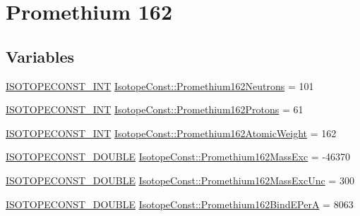 \hypertarget{group___isotope_const-_promethium-_pm162}{}\section{Promethium 162}
\label{group___isotope_const-_promethium-_pm162}
\subsection*{Variables}
\begin{DoxyCompactItemize}
\item 
\mbox{\hyperlink{group___isotope_const-_macros_ga5f18360b3e99483a35c32d789e62621c}{I\+S\+O\+T\+O\+P\+E\+C\+O\+N\+S\+T\+\_\+\+I\+NT}} \mbox{\hyperlink{group___isotope_const-_promethium-_pm162_ga5358b4eb7dfb42b98f19859640707a99}{Isotope\+Const\+::\+Promethium162\+Neutrons}} = 101
\item 
\mbox{\hyperlink{group___isotope_const-_macros_ga5f18360b3e99483a35c32d789e62621c}{I\+S\+O\+T\+O\+P\+E\+C\+O\+N\+S\+T\+\_\+\+I\+NT}} \mbox{\hyperlink{group___isotope_const-_promethium-_pm162_ga17e4b0c58109314fa5bb46483b16d003}{Isotope\+Const\+::\+Promethium162\+Protons}} = 61
\item 
\mbox{\hyperlink{group___isotope_const-_macros_ga5f18360b3e99483a35c32d789e62621c}{I\+S\+O\+T\+O\+P\+E\+C\+O\+N\+S\+T\+\_\+\+I\+NT}} \mbox{\hyperlink{group___isotope_const-_promethium-_pm162_ga0e86ff697e97b1bd37244df235bbaf2f}{Isotope\+Const\+::\+Promethium162\+Atomic\+Weight}} = 162
\item 
\mbox{\hyperlink{group___isotope_const-_macros_ga8f45a7272ce02c0b4c65c44636ed719a}{I\+S\+O\+T\+O\+P\+E\+C\+O\+N\+S\+T\+\_\+\+D\+O\+U\+B\+LE}} \mbox{\hyperlink{group___isotope_const-_promethium-_pm162_gabd7f8c791acbcd81809ca4e8872c1cba}{Isotope\+Const\+::\+Promethium162\+Mass\+Exc}} = -\/46370
\item 
\mbox{\hyperlink{group___isotope_const-_macros_ga8f45a7272ce02c0b4c65c44636ed719a}{I\+S\+O\+T\+O\+P\+E\+C\+O\+N\+S\+T\+\_\+\+D\+O\+U\+B\+LE}} \mbox{\hyperlink{group___isotope_const-_promethium-_pm162_ga40b863f67ff442c05462699e775a98be}{Isotope\+Const\+::\+Promethium162\+Mass\+Exc\+Unc}} = 300
\item 
\mbox{\hyperlink{group___isotope_const-_macros_ga8f45a7272ce02c0b4c65c44636ed719a}{I\+S\+O\+T\+O\+P\+E\+C\+O\+N\+S\+T\+\_\+\+D\+O\+U\+B\+LE}} \mbox{\hyperlink{group___isotope_const-_promethium-_pm162_ga84da5b46d7ca50d3b9af30f70542cd34}{Isotope\+Const\+::\+Promethium162\+Bind\+E\+PerA}} = 8063
\item 

\end{DoxyCompactItemize}
